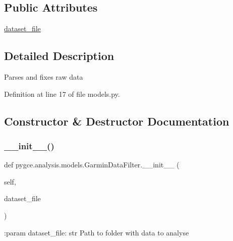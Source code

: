\subsection*{Public Attributes}
\begin{DoxyCompactItemize}
\item 
\hyperlink{classpygce_1_1analysis_1_1models_1_1_garmin_data_filter_a7bb7be05577c2d31546e27823a5d11c5}{dataset\+\_\+file}
\end{DoxyCompactItemize}


\subsection{Detailed Description}
\begin{DoxyVerb}Parses and fixes raw data \end{DoxyVerb}
 

Definition at line 17 of file models.\+py.



\subsection{Constructor \& Destructor Documentation}
\mbox{\label{classpygce_1_1analysis_1_1models_1_1_garmin_data_filter_ae5dcf7d3dd4f98145960b2a751b163d2}} 
\subsubsection{\texorpdfstring{\+\_\+\+\_\+init\+\_\+\+\_\+()}{\_\_init\_\_()}}
{\footnotesize\ttfamily def pygce.\+analysis.\+models.\+Garmin\+Data\+Filter.\+\_\+\+\_\+init\+\_\+\+\_\+ (\begin{DoxyParamCaption}\item[{}]{self,  }\item[{}]{dataset\+\_\+file }\end{DoxyParamCaption})}

\begin{DoxyVerb}:param dataset_file: str
    Path to folder with data to analyse
\end{DoxyVerb}
 

